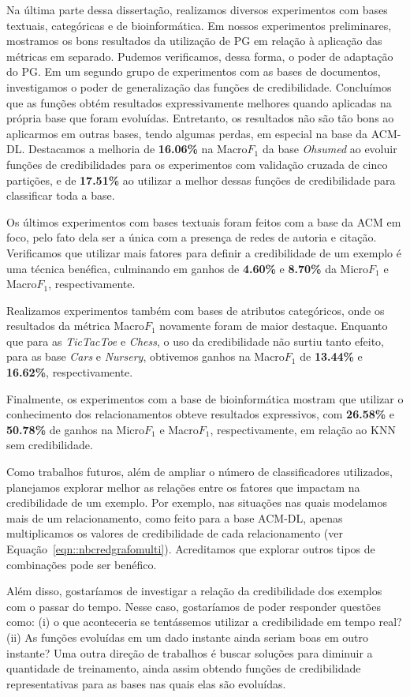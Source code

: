 Na última parte dessa dissertação, realizamos diversos experimentos com bases textuais, categóricas e de bioinformática. Em nossos experimentos preliminares, mostramos os bons resultados da utilização de \textsc{PG} em relação à aplicação das métricas em separado. Pudemos verificamos, dessa forma, o poder de adaptação do \textsc{PG}.
Em um segundo grupo de experimentos com as bases de documentos, investigamos o poder de generalização das funções de credibilidade. Concluímos que as funções obtém resultados expressivamente melhores quando aplicadas na própria base que foram evoluídas. Entretanto, os resultados não são tão bons ao aplicarmos em outras bases, tendo algumas perdas, em especial na base da \textsc{ACM-DL}.
Destacamos a melhoria de \textbf{16.06\%} na Macro$F_1$ da base \textit{Ohsumed} ao evoluir funções de credibilidades para os experimentos com validação cruzada de cinco partições, e de
\textbf{17.51\%} ao utilizar a melhor dessas funções de credibilidade para classificar toda a base.

Os últimos experimentos com bases textuais foram feitos com a base da \textsc{ACM} em foco, pelo fato dela ser a única com a presença de redes de autoria e citação. Verificamos que utilizar mais fatores para definir a credibilidade de um exemplo é uma técnica benéfica, culminando em ganhos de \textbf{4.60\%} e \textbf{8.70\%} da Micro$F_1$ e Macro$F_1$, respectivamente.

Realizamos experimentos também com bases de atributos categóricos, onde os resultados da métrica Macro$F_1$ novamente foram de maior destaque. Enquanto que para as \textit{TicTacToe} e \textit{Chess}, o uso da credibilidade não surtiu tanto efeito, para as base \textit{Cars} e \textit{Nursery}, obtivemos ganhos na Macro$F_1$ de \textbf{13.44\%} e \textbf{16.62\%}, respectivamente.

Finalmente, os experimentos com a base de bioinformática mostram que utilizar o conhecimento dos relacionamentos obteve resultados expressivos, com \textbf{26.58\%} e \textbf{50.78\%} de ganhos na Micro$F_1$ e Macro$F_1$,
respectivamente,
em relação ao \textsc{KNN} sem credibilidade.

Como trabalhos futuros, além de ampliar o número de classificadores utilizados, planejamos explorar melhor as relações entre os fatores que impactam na credibilidade de um exemplo. Por exemplo, nas situações nas quais modelamos mais de um relacionamento, como feito para a base \textsc{ACM-DL}, apenas multiplicamos os valores de credibilidade de cada relacionamento (ver Equação~\ref{eqn::nbcredgrafomulti}). Acreditamos que explorar outros tipos de combinações pode ser benéfico.

Além disso, gostaríamos de investigar a relação da credibilidade dos exemplos com o passar do tempo. Nesse caso, gostaríamos de poder responder questões como: (i) o que aconteceria se tentássemos utilizar a credibilidade em tempo real? (ii) As funções evoluídas em um dado instante ainda seriam boas em outro instante? Uma outra direção de trabalhos é buscar soluções para diminuir a quantidade de treinamento, ainda assim obtendo funções de credibilidade representativas para as bases nas quais elas são evoluídas.


